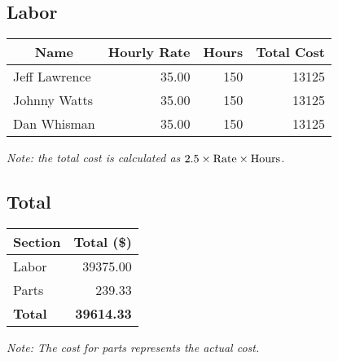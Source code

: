 \subsection{Labor}
\begin{center}
\begin{tabular}{|l|r|r||r|}
\hline
\multicolumn{1}{|c}{Name} & \multicolumn{1}{|c}{Hourly Rate} & \multicolumn{1}{|c||}{Hours} & \multicolumn{1}{c|}{Total Cost}\\
\hline\hline
Jeff Lawrence & 35.00 & 150 & 13125 \\
\hline
Johnny Watts  & 35.00 & 150 & 13125 \\
\hline
Dan Whisman   & 35.00 & 150 & 13125 \\
\hline
\end{tabular}

{\it Note: the total cost is calculated as $2.5\times {\rm Rate} \times {\rm Hours}$.}
\end{center}

\subsection{Total}
\begin{center}
\begin{tabular}{|l|r|}
\hline
\multicolumn{1}{|c}{Section} & \multicolumn{1}{|c|}{Total (\$)} \\
\hline\hline
Labor       & 39375.00 \\
\hline
Parts       & 239.33   \\
\hline
{\bf Total} & {\bf 39614.33} \\
\hline
\end{tabular}
\emph{Note: The cost for parts represents the actual cost.}
\end{center}
